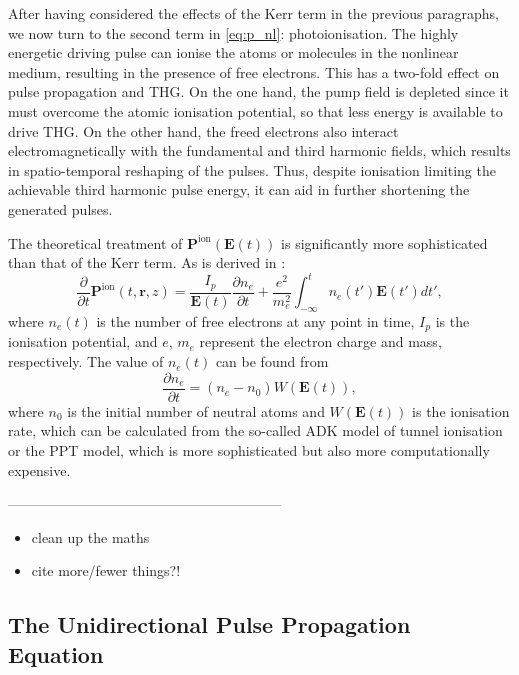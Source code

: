 \documentclass[a4paper]{jpconf}
\begin{document}
After having considered the effects of the Kerr term in the previous paragraphs, we now turn to the second term in \eqref{eq:p_nl}: photoionisation. The highly energetic driving pulse can ionise the atoms or molecules in the nonlinear medium, resulting in the presence of free electrons. This has a two-fold effect on pulse propagation and THG. On the one hand, the pump field is depleted since it must overcome the atomic ionisation potential, so that less energy is available to drive THG. On the other hand, the freed electrons also interact electromagnetically with the fundamental and third harmonic fields, which results in spatio-temporal reshaping of the pulses. Thus, despite ionisation limiting the achievable third harmonic pulse energy, it can aid in further shortening the generated pulses. \par 
The theoretical treatment of $\mathbf{P}^\text{ion}(\mathbf{E}(t))$ is significantly more sophisticated than that of the Kerr term. As is derived in \cite{geissler1999}:
\begin{equation}\label{eq:p_ion}
\frac{\partial}{\partial t} \mathbf{P}^\text{ion}(t, \mathbf{r},z) = \frac{I_p}{\mathbf{E}(t)} \frac{\partial n_e}{\partial t} + \frac{e^2}{m_e^2} \int_{-\infty}^t n_e(t') \mathbf{E}(t')dt',
\end{equation} 
where $n_e(t)$ is the number of free electrons at any point in time, $I_p$ is the ionisation potential, and $e$, $m_e$ represent the electron charge and mass, respectively. The value of $n_e(t)$ can be found from 
\begin{equation}
\frac{\partial n_e}{\partial t} = (n_e - n_0) W(\mathbf{E}(t)),
\end{equation}
where $n_0$ is the initial number of neutral atoms and $W(\mathbf{E}(t))$ is the ionisation rate, which can be calculated from the so-called ADK model of tunnel ionisation or the PPT model, which is more sophisticated but also more computationally expensive. 

-----------------------------------------------------------
\begin{itemize}
\item clean up the maths 
\item cite more/fewer things?!
\end{itemize}

\subsection{The Unidirectional Pulse Propagation Equation}
\end{document}
